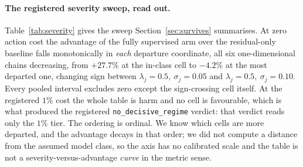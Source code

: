 \documentclass{article}
\begin{document}
\paragraph{The registered severity sweep, read out.} Table~\ref{tab:severity} gives
the sweep Section~\ref{sec:survives} summarises. At zero action cost the advantage
of the fully supervised arm over the residual-only baseline falls monotonically in
\emph{each} departure coordinate, all six one-dimensional chains decreasing, from
$+27.7\%$ at the in-class cell to $-4.2\%$ at the most departed one, changing sign
between $\lambda_j = 0.5,\ \sigma_j = 0.05$ and $\lambda_j = 0.5,\ \sigma_j = 0.10$.
Every pooled interval excludes zero except the sign-crossing cell itself. At the
registered $1\%$ cost the whole table is harm and no cell is favourable, which is
what produced the registered \texttt{no\_decisive\_regime} verdict: that verdict
reads only the $1\%$ tier. The ordering is ordinal. We know which cells are more
departed, and the advantage decays in that order; we did not compute a distance from
the assumed model class, so the axis has no calibrated scale and the table is not a
severity-versus-advantage \emph{curve} in the metric sense.
\end{document}
